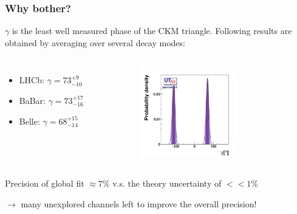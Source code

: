 \documentclass[]{beamer}
\begin{document}
\begin{frame}
\frametitle{Why bother?}

$\gamma$ is the least well measured phase of the CKM triangle. Following results are obtained by averaging over several decay modes:

\begin{columns}

\begin{itemize}

\item LHCb: $\gamma = 73^{+9}_{-10}$

\item BaBar: $\gamma = 73^{+17}_{-16}$

\item Belle:  $\gamma = 68^{+15}_{-14}$

\end{itemize}


\begin{figure}
\includegraphics[width=6.0cm,height=4.0cm]{pics/summer14_gammaOUT_fullfit_gamma}
\end{figure}

\end{columns}

Precision of global fit $\approx 7\%$  v.s. the theory uncertainty of $<<1\%$  \newline \newline

$\rightarrow$ many unexplored channels left to improve the overall precision!

\end{frame}
\end{document}
